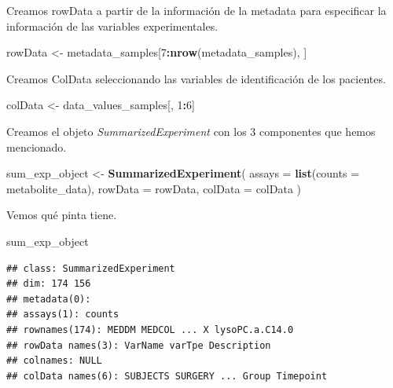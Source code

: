 \documentclass[
]{article}
\newenvironment{Shaded}{\begin{snugshade}}{\end{snugshade}}
\newcommand{\AttributeTok}[1]{\textcolor[rgb]{0.13,0.29,0.53}{#1}}
\newcommand{\DecValTok}[1]{\textcolor[rgb]{0.00,0.00,0.81}{#1}}
\newcommand{\FunctionTok}[1]{\textcolor[rgb]{0.13,0.29,0.53}{\textbf{#1}}}
\newcommand{\NormalTok}[1]{#1}
\newcommand{\OtherTok}[1]{\textcolor[rgb]{0.56,0.35,0.01}{#1}}
\newcommand{\SpecialCharTok}[1]{\textcolor[rgb]{0.81,0.36,0.00}{\textbf{#1}}}
\begin{document}
Creamos rowData a partir de la información de la metadata para
especificar la información de las variables experimentales.

\begin{Shaded}
\begin{Highlighting}[]
\NormalTok{rowData }\OtherTok{\textless{}{-}}\NormalTok{ metadata\_samples[}\DecValTok{7}\SpecialCharTok{:}\FunctionTok{nrow}\NormalTok{(metadata\_samples), ]}
\end{Highlighting}
\end{Shaded}

Creamos ColData seleccionando las variables de identificación de los
pacientes.

\begin{Shaded}
\begin{Highlighting}[]
\NormalTok{colData }\OtherTok{\textless{}{-}}\NormalTok{ data\_values\_samples[, }\DecValTok{1}\SpecialCharTok{:}\DecValTok{6}\NormalTok{]}
\end{Highlighting}
\end{Shaded}

Creamos el objeto \emph{SummarizedExperiment} con los 3 componentes que
hemos mencionado.

\begin{Shaded}
\begin{Highlighting}[]
\NormalTok{sum\_exp\_object }\OtherTok{\textless{}{-}} \FunctionTok{SummarizedExperiment}\NormalTok{(}
  \AttributeTok{assays =} \FunctionTok{list}\NormalTok{(}\AttributeTok{counts =}\NormalTok{ metabolite\_data),}
  \AttributeTok{rowData =}\NormalTok{ rowData,}
  \AttributeTok{colData =}\NormalTok{ colData}
\NormalTok{)}
\end{Highlighting}
\end{Shaded}

Vemos qué pinta tiene.

\begin{Shaded}
\begin{Highlighting}[]
\NormalTok{sum\_exp\_object}
\end{Highlighting}
\end{Shaded}

\begin{verbatim}
## class: SummarizedExperiment 
## dim: 174 156 
## metadata(0):
## assays(1): counts
## rownames(174): MEDDM MEDCOL ... X lysoPC.a.C14.0
## rowData names(3): VarName varTpe Description
## colnames: NULL
## colData names(6): SUBJECTS SURGERY ... Group Timepoint
\end{verbatim}
\end{document}
